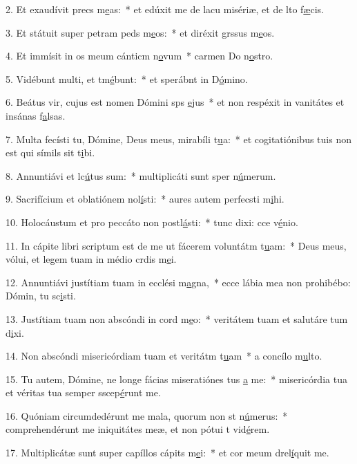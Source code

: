 2. Et exaudívit precs m\uline{e}as:~* et edúxit me de lacu misériæ, et de lto f\uline{æ}cis.\par 
3. Et státuit super petram peds m\uline{e}os:~* et diréxit grssus m\uline{e}os.\par 
4. Et immísit in os meum cánticm n\uline{o}vum~* carmen Do n\uline{o}stro.\par 
5. Vidébunt multi, et tm\uline{é}bunt:~* et sperábnt in D\uline{ó}mino.\par 
6. Beátus vir, cujus est nomen Dómini sps \uline{e}jus~* et non respéxit in vanitátes et insánas f\uline{a}lsas.\par 
7. Multa fecísti tu, Dómine, Deus meus, mirabíli t\uline{u}a:~* et cogitatiónibus tuis non est qui símils sit t\uline{i}bi.\par 
8. Annuntiávi et lc\uline{ú}tus sum:~* multiplicáti sunt sper n\uline{ú}merum.\par 
9. Sacrifícium et oblatiónem nol\uline{í}sti:~* aures autem perfecsti m\uline{i}hi.\par 
10. Holocáustum et pro peccáto non postl\uline{á}sti:~* tunc dixi: cce v\uline{é}nio.\par 
11. In cápite libri scriptum est de me ut fácerem voluntátm t\uline{u}am:~* Deus meus, vólui, et legem tuam in médio crdis m\uline{e}i.\par 
12. Annuntiávi justítiam tuam in ecclési m\uline{a}gna,~* ecce lábia mea non prohibébo: Dómin, tu sc\uline{i}sti.\par 
13. Justítiam tuam non abscóndi in cord m\uline{e}o:~* veritátem tuam et salutáre tum d\uline{i}xi.\par 
14. Non abscóndi misericórdiam tuam et veritátm t\uline{u}am~* a concílo m\uline{u}lto.\par 
15. Tu autem, Dómine, ne longe fácias miseratiónes tus \uline{a} me:~* misericórdia tua et véritas tua semper sscep\uline{é}runt me.\par 
16. Quóniam circumdedérunt me mala, quorum non st n\uline{ú}merus:~* comprehendérunt me iniquitátes meæ, et non pótui t vid\uline{é}rem.\par 
17. Multiplicátæ sunt super capíllos cápits m\uline{e}i:~* et cor meum drel\uline{í}quit me.\par 
